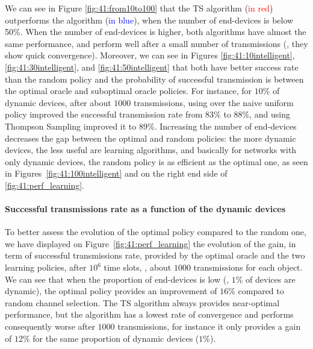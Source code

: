 We can see in Figure \ref{fig:41:from10to100} that the TS algorithm (\textcolor{red}{in red}) outperforms the \UCB{} algorithm (\textcolor{blue}{in blue}), when the number of end-devices is below 50\%. When the number of end-devices is higher, both algorithms have almost the same performance, and perform well after a small number of transmissions (\ie, they show quick convergence).
Moreover, we can see in Figures \ref{fig:41:10intelligent}, \ref{fig:41:30intelligent}, and \ref{fig:41:50intelligent} that both have better success rate than the random policy and the probability of successful transmission is between the optimal oracle and suboptimal oracle policies.
For instance, for $10\%$ of dynamic devices, after about $1000$ transmissions, using \UCB{} over the naive uniform policy improved the successful transmission rate from $83\%$ to $88\%$, and using Thompson Sampling improved it to $89\%$.
Increasing the number of end-devices decreases the gap between the optimal and random policies: the more dynamic devices, the less useful are learning algorithms, and basically for networks with only dynamic devices, the random policy is as efficient as the optimal one, as seen in Figures~\ref{fig:41:100intelligent} and on the right end side of \ref{fig:41:perf_learning}.


\paragraph{Successful transmissions rate as a function of the dynamic devices}

To better assess the evolution of the optimal policy compared to the random one, we have displayed on Figure~\ref{fig:41:perf_learning} the evolution of the gain, in term of successful transmissions rate, provided by the optimal oracle and the two learning policies, after $10^6$ time slots, \ie, about $1000$ transmissions for each object.
We can see that when the proportion of end-devices is low (\eg, $1\%$ of devices are dynamic), the optimal policy provides an improvement of $16\%$ compared to random channel selection.
The TS algorithm always provides near-optimal performance, but the \UCB{} algorithm has a lowest rate of convergence and performs consequently worse after $1000$ transmissions, for instance it only provides a gain of $12\%$ for the same proportion of dynamic devices ($1\%$).

